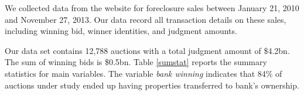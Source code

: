 \documentclass[11pt,twopage]{article}
\begin{document}
We collected data from the website for foreclosure sales between
January 21, 2010 and November 27, 2013. Our data record all
transaction details on these sales, including winning bid, winner
identities, and judgment
amounts.%



Our data set contains 12,788 auctions with a total judgment amount of
\$4.2bn. The sum of winning bids is \$0.5bn.  Table \ref{sumstat}
reports the summary statistics for main variables.  The variable
\textit{bank winning} indicates that 84\% of auctions under study
ended up having properties transferred to bank's ownership.

\end{document}
